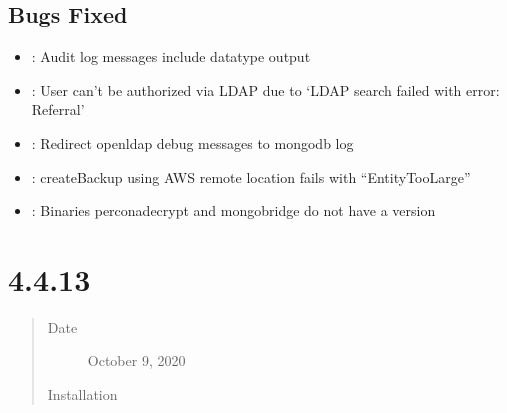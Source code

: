 \documentclass[letterpaper,10pt,english]{sphinxmanual}
\begin{document}
\subsection{Bugs Fixed}
\label{\detokenize{release_notes/4.4.2-4:bugs-fixed}}\begin{itemize}
\item {} 
\sphinxAtStartPar
{}: Audit log messages include datatype output

\item {} 
\sphinxAtStartPar
{}: User can’t be authorized via LDAP due to ‘LDAP search failed with error: Referral’

\item {} 
\sphinxAtStartPar
{}: Redirect openldap debug messages to mongodb log

\item {} 
\sphinxAtStartPar
{}: createBackup using AWS remote location fails with “EntityTooLarge”

\item {} 
\sphinxAtStartPar
{}: Binaries perconadecrypt and mongobridge do not have a version

\end{itemize}


\section{ 4.4.1\sphinxhyphen{}3}
\label{\detokenize{release_notes/4.4.1-3:percona-server-for-mongodb-4-4-1-3}}\label{\detokenize{release_notes/4.4.1-3:psmdb-4-4-1-3}}\label{\detokenize{release_notes/4.4.1-3::doc}}\begin{quote}\begin{description}
\item[{Date}] \leavevmode
\sphinxAtStartPar
October 9, 2020

\item[{Installation}] \leavevmode
\sphinxAtStartPar
{}

\end{description}\end{quote}
\end{document}
